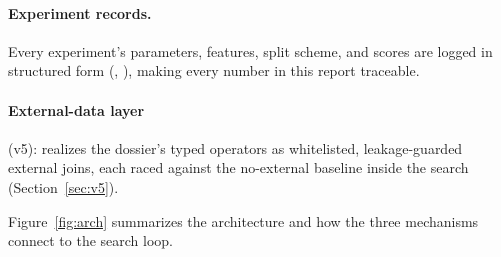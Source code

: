 \documentclass[11pt,a4paper]{article}
\begin{document}
\paragraph{Experiment records.} Every experiment's parameters, features, split scheme, and scores are logged in structured form (, ), making every number in this report traceable.

\paragraph{External-data layer} (v5): realizes the dossier's typed operators as whitelisted, leakage-guarded external joins, each raced against the no-external baseline inside the search (Section~\ref{sec:v5}).

Figure~\ref{fig:arch} summarizes the architecture and how the three mechanisms connect to the search loop.
\end{document}

